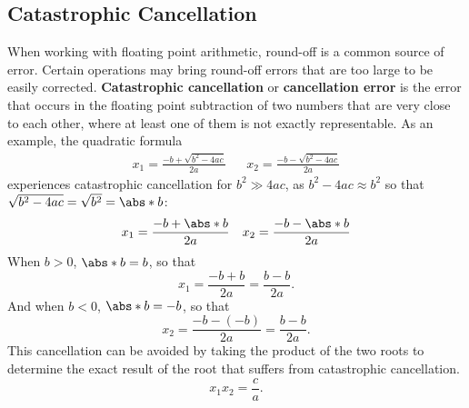 \documentclass{article}
\begin{document}
\subsection{Catastrophic Cancellation}
When working with floating point arithmetic, round-off is a common
source of error. Certain operations may bring round-off errors that are
too large to be easily corrected. \textbf{Catastrophic cancellation} or
\textbf{cancellation error} is the error that occurs in the floating
point subtraction of two numbers that are very close to each other,
where at least one of them is not exactly representable. As an example,
the quadratic formula
\begin{align*}
    x_1 = \frac{-b + \sqrt{b^2 - 4 a c}}{2 a} &  & x_2 = \frac{-b - \sqrt{b^2 - 4 a c}}{2 a}
\end{align*}
experiences catastrophic cancellation for \(b^2 \gg 4ac\), as \(b^2 - 4ac \approx b^2\) so that
\(\sqrt{b^2 - 4ac} = \sqrt{b^2} = \abs*{b}\):
\begin{align*}
    x_1 = \frac{-b + \abs*{b}}{2 a} &  & x_2 = \frac{-b - \abs*{b}}{2 a}
\end{align*}
When \(b > 0\), \(\abs*{b} = b\), so that
\begin{equation*}
    x_1 = \frac{-b + b}{2a} = \frac{b - b}{2a}.
\end{equation*}
And when \(b < 0\), \(\abs*{b} = -b\), so that
\begin{equation*}
    x_2 = \frac{-b - \left( -b \right)}{2a} = \frac{b - b}{2a}.
\end{equation*}
This cancellation can be avoided by taking the product of the two roots
to determine the exact result of the root that suffers from catastrophic
cancellation.
\begin{equation*}
    x_1 x_2 = \frac{c}{a}.
\end{equation*}
\end{document}
